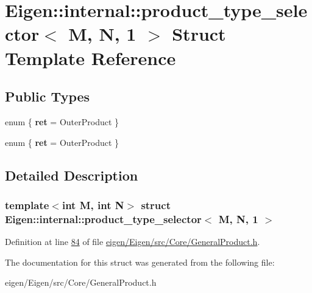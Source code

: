 \hypertarget{struct_eigen_1_1internal_1_1product__type__selector_3_01_m_00_01_n_00_011_01_4}{}\section{Eigen\+:\+:internal\+:\+:product\+\_\+type\+\_\+selector$<$ M, N, 1 $>$ Struct Template Reference}
\label{struct_eigen_1_1internal_1_1product__type__selector_3_01_m_00_01_n_00_011_01_4}
\subsection*{Public Types}
\begin{DoxyCompactItemize}
\item 
\mbox{\label{struct_eigen_1_1internal_1_1product__type__selector_3_01_m_00_01_n_00_011_01_4_aa03f8b574b159a0245fb2873f16a1604}} 
enum \{ {\bfseries ret} = Outer\+Product
 \}
\item 
\mbox{\label{struct_eigen_1_1internal_1_1product__type__selector_3_01_m_00_01_n_00_011_01_4_a7ab344e7f2ed24a2ca96a2747f525a6e}} 
enum \{ {\bfseries ret} = Outer\+Product
 \}
\end{DoxyCompactItemize}


\subsection{Detailed Description}
\subsubsection*{template$<$int M, int N$>$\newline
struct Eigen\+::internal\+::product\+\_\+type\+\_\+selector$<$ M, N, 1 $>$}



Definition at line \hyperlink{eigen_2_eigen_2src_2_core_2_general_product_8h_source_l00084}{84} of file \hyperlink{eigen_2_eigen_2src_2_core_2_general_product_8h_source}{eigen/\+Eigen/src/\+Core/\+General\+Product.\+h}.



The documentation for this struct was generated from the following file\+:\begin{DoxyCompactItemize}
\item 
eigen/\+Eigen/src/\+Core/\+General\+Product.\+h\end{DoxyCompactItemize}
